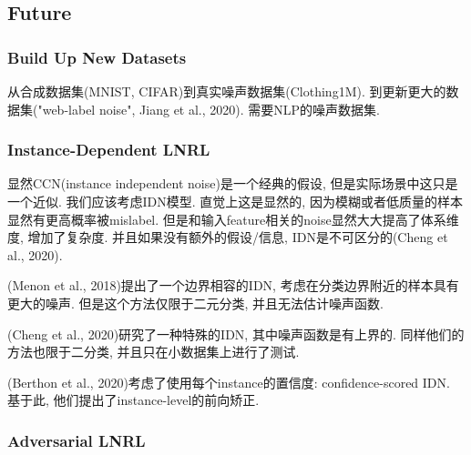 \documentclass{article}
\begin{document}
\subsection{Future}

\subsubsection{Build Up New Datasets}

从合成数据集(MNIST, CIFAR)到真实噪声数据集(Clothing1M). 到更新更大的数据集("web-label noise", Jiang et al., 2020). 需要NLP的噪声数据集.

\subsubsection{Instance-Dependent LNRL}

显然CCN(instance independent noise)是一个经典的假设, 但是实际场景中这只是一个近似. 我们应该考虑IDN模型. 直觉上这是显然的, 因为模糊或者低质量的样本显然有更高概率被mislabel. 但是和输入feature相关的noise显然大大提高了体系维度, 增加了复杂度. 并且如果没有额外的假设/信息, IDN是不可区分的(Cheng et al., 2020).

(Menon  et  al., 2018)提出了一个边界相容的IDN, 考虑在分类边界附近的样本具有更大的噪声. 但是这个方法仅限于二元分类, 并且无法估计噪声函数.

(Cheng et al., 2020)研究了一种特殊的IDN, 其中噪声函数是有上界的. 同样他们的方法也限于二分类, 并且只在小数据集上进行了测试.

(Berthon et al., 2020)考虑了使用每个instance的置信度: confidence-scored IDN. 基于此, 他们提出了instance-level的前向矫正.

\subsubsection{Adversarial LNRL}
\end{document}

